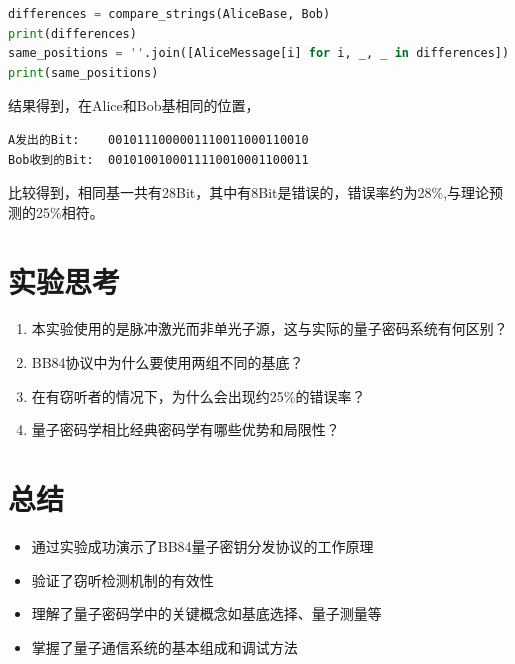 \documentclass{ctexart}
\begin{document}
\begin{enumerate}
\begin{lstlisting}[language=python]
differences = compare_strings(AliceBase, Bob)
print(differences)
same_positions = ''.join([AliceMessage[i] for i, _, _ in differences])
print(same_positions)
\end{lstlisting}
结果得到，在Alice和Bob基相同的位置，
\begin{lstlisting}
A发出的Bit:    0010111000001110011000110010
Bob收到的Bit:  0010100100011110010001100011
\end{lstlisting}

比较得到，相同基一共有28Bit，其中有8Bit是错误的，错误率约为28\%,与理论预测的25\%相符。
\end{enumerate}
\section{实验思考}
\begin{enumerate}
\item 本实验使用的是脉冲激光而非单光子源，这与实际的量子密码系统有何区别？
\item BB84协议中为什么要使用两组不同的基底？
\item 在有窃听者的情况下，为什么会出现约25\%的错误率？
\item 量子密码学相比经典密码学有哪些优势和局限性？
\end{enumerate}

\section{总结}
\begin{itemize}
\item 通过实验成功演示了BB84量子密钥分发协议的工作原理
\item 验证了窃听检测机制的有效性
\item 理解了量子密码学中的关键概念如基底选择、量子测量等
\item 掌握了量子通信系统的基本组成和调试方法
\end{itemize}
\end{document}
